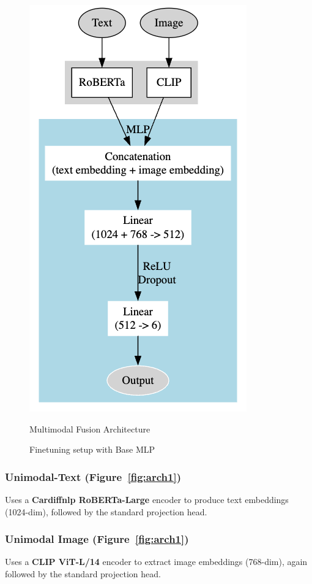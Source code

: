 \begin{figure}[h]
\begin{minipage}{0.49\textwidth}
        \includegraphics[height=0.5\textheight]{images/multimodal.png}
        \caption{Multimodal Fusion Architecture}
        \label{fig:arch2}
    \end{minipage}
    \caption{Finetuning setup with Base MLP}
    \label{fig:architecture}
\end{figure}

\subsubsection*{Unimodal-Text (Figure~\ref{fig:arch1})}
Uses a \textbf{Cardiffnlp RoBERTa-Large} encoder to produce text embeddings (1024-dim), followed by the standard projection head.

\subsubsection*{Unimodal Image (Figure~\ref{fig:arch1})}
Uses a \textbf{CLIP ViT-L/14} encoder to extract image embeddings (768-dim), again followed by the standard projection head.

